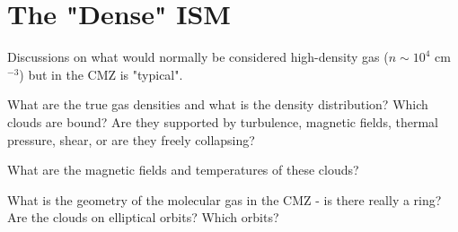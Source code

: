 \section{The "Dense" ISM}
Discussions on what would normally be considered high-density gas ($n\sim10^4$ cm$^{-3}$) but in the CMZ is "typical".

What are the true gas densities and what is the density distribution?  Which clouds are bound?  Are they supported by turbulence, magnetic fields, thermal pressure, shear, or are they freely collapsing?

What are the magnetic fields and temperatures of these clouds?

What is the geometry of the molecular gas in the CMZ - is there really a ring?  Are the clouds on elliptical orbits?  Which orbits?